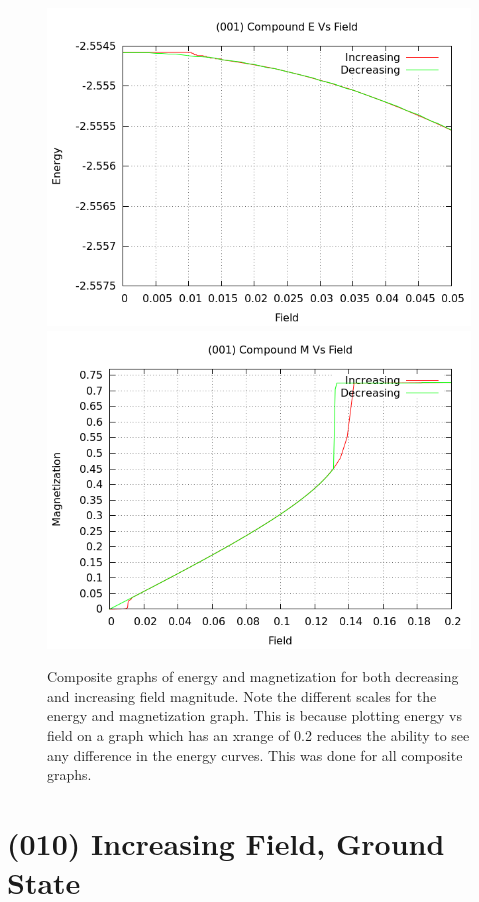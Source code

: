 \documentclass{article}
\begin{document}
\begin{figure}[ht]
\centering
\includegraphics[scale=0.5]{HVariedData/compoundEM/001Ecompound.png}
\includegraphics[scale=0.5]{HVariedData/compoundEM/001Mcompound.png}
\caption{Composite graphs of energy and magnetization for both decreasing and increasing field magnitude. Note the
different scales for the energy and magnetization graph. This is because plotting energy vs field on a graph
which has an xrange of 0.2 reduces the ability to see any difference in the energy curves. This was done for all 
composite graphs.}
\end{figure}
\clearpage


\section{(010) Increasing Field, Ground State}
\end{document}
